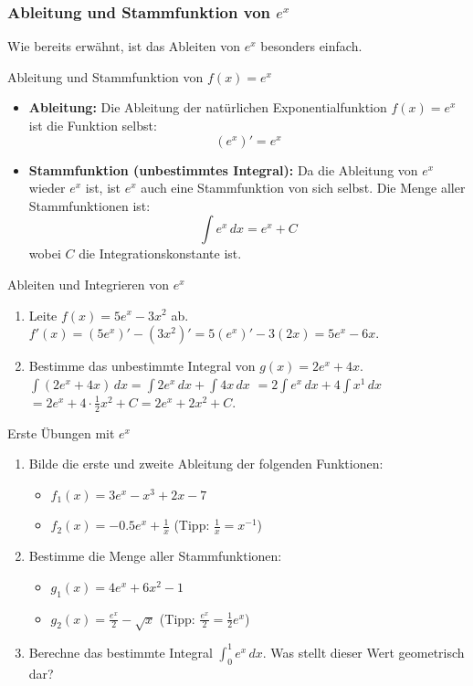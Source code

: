 \subsubsection{Ableitung und Stammfunktion von $e^x$}

Wie bereits erwähnt, ist das Ableiten von $e^x$ besonders einfach.

\begin{merksatzumgebung}{Ableitung und Stammfunktion von $f(x)=e^x$}
\begin{itemize}
    \item \textbf{Ableitung:} Die Ableitung der natürlichen Exponentialfunktion $f(x)=e^x$ ist die Funktion selbst:
    \[ (e^x)' = e^x \]
    \item \textbf{Stammfunktion (unbestimmtes Integral):} Da die Ableitung von $e^x$ wieder $e^x$ ist, ist $e^x$ auch eine Stammfunktion von sich selbst. Die Menge aller Stammfunktionen ist:
    \[ \int e^x \,dx = e^x + C \]
    wobei $C$ die Integrationskonstante ist.
\end{itemize}
\end{merksatzumgebung}

\begin{beispielumgebung}{Ableiten und Integrieren von $e^x$}
\begin{enumerate}
    \item Leite $f(x) = 5e^x - 3x^2$ ab.
        $f'(x) = (5e^x)' - (3x^2)' = 5(e^x)' - 3(2x) = 5e^x - 6x$.
    \item Bestimme das unbestimmte Integral von $g(x) = 2e^x + 4x$.
        $\int (2e^x + 4x) \,dx = \int 2e^x \,dx + \int 4x \,dx$
        $= 2 \int e^x \,dx + 4 \int x^1 \,dx$
        $= 2e^x + 4 \cdot \frac{1}{2}x^2 + C = 2e^x + 2x^2 + C$.
\end{enumerate}
\end{beispielumgebung}

\begin{aufgabenumgebung}{Erste Übungen mit $e^x$}
\begin{enumerate}
    \item Bilde die erste und zweite Ableitung der folgenden Funktionen:
        \begin{itemize}
            \item $f_1(x) = 3e^x - x^3 + 2x - 7$
            \item $f_2(x) = -0.5e^x + \frac{1}{x}$ (Tipp: $\frac{1}{x} = x^{-1}$)
        \end{itemize}
    \item Bestimme die Menge aller Stammfunktionen:
        \begin{itemize}
            \item $g_1(x) = 4e^x + 6x^2 - 1$
            \item $g_2(x) = \frac{e^x}{2} - \sqrt{x}$ (Tipp: $\frac{e^x}{2} = \frac{1}{2}e^x$)
        \end{itemize}
    \item Berechne das bestimmte Integral $\int_0^1 e^x \,dx$. Was stellt dieser Wert geometrisch dar?
\end{enumerate}
\end{aufgabenumgebung}

